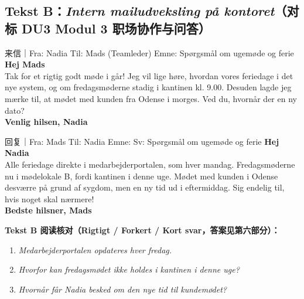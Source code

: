 \subsection*{Tekst B：\textit{Intern mailudveksling på kontoret}（对标 DU3 Modul 3 职场协作与问答）}

\begin{emailbox}{来信｜Fra: Nadia \quad Til: Mads (Teamleder) \quad Emne: Spørgsmål om ugemøde og ferie}
\textbf{Hej Mads}\\
Tak for et rigtig godt møde i går! Jeg vil lige høre, hvordan vores feriedage  i det nye system, og om fredagsmøderne stadig  i kantinen kl. 9.00. Desuden lagde jeg mærke til, at mødet med kunden fra Odense  i morges. Ved du, hvornår der  en ny dato?\\
\textbf{Venlig hilsen, Nadia}
\end{emailbox}

\begin{emailbox}{回复｜Fra: Mads \quad Til: Nadia \quad Emne: Sv: Spørgsmål om ugemøde og ferie}
\textbf{Hej Nadia}\\
Alle feriedage  direkte i medarbejderportalen, som  hver mandag. Fredagsmøderne  nu i mødelokale B, fordi kantinen  i denne uge. Mødet med kunden i Odense  desværre  på grund af sygdom, men en ny tid  ud i eftermiddag. Sig endelig til, hvis noget skal  nærmere!\\
\textbf{Bedste hilsner, Mads}
\end{emailbox}

\textbf{Tekst B 阅读核对（Rigtigt / Forkert / Kort svar，答案见第六部分）：}
\begin{enumerate}
  \item \textit{Medarbejderportalen opdateres hver fredag.} \underline{\hspace{2.2cm}}
  \item \textit{Hvorfor kan fredagsmødet ikke holdes i kantinen i denne uge?} \underline{\hspace{5.5cm}}
  \item \textit{Hvornår får Nadia besked om den nye tid til kundemødet?} \underline{\hspace{4.5cm}}
\end{enumerate}

